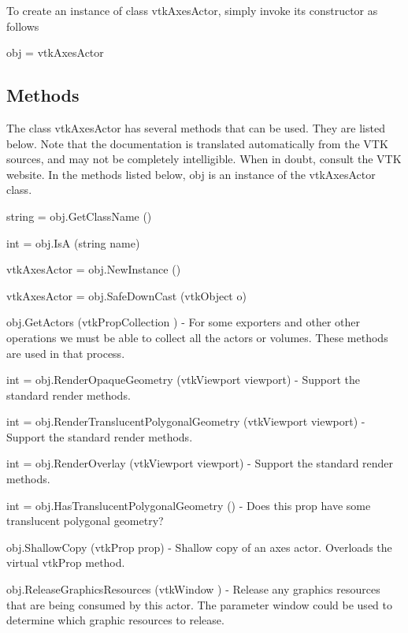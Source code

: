 To create an instance of class vtk\-Axes\-Actor, simply invoke its constructor as follows \begin{DoxyVerb}  obj = vtkAxesActor
\end{DoxyVerb}
 \hypertarget{vtkwidgets_vtkxyplotwidget_Methods}{}\subsection{Methods}\label{vtkwidgets_vtkxyplotwidget_Methods}
The class vtk\-Axes\-Actor has several methods that can be used. They are listed below. Note that the documentation is translated automatically from the V\-T\-K sources, and may not be completely intelligible. When in doubt, consult the V\-T\-K website. In the methods listed below, {\ttfamily obj} is an instance of the vtk\-Axes\-Actor class. 
\begin{DoxyItemize}
\item {\ttfamily string = obj.\-Get\-Class\-Name ()}  
\item {\ttfamily int = obj.\-Is\-A (string name)}  
\item {\ttfamily vtk\-Axes\-Actor = obj.\-New\-Instance ()}  
\item {\ttfamily vtk\-Axes\-Actor = obj.\-Safe\-Down\-Cast (vtk\-Object o)}  
\item {\ttfamily obj.\-Get\-Actors (vtk\-Prop\-Collection )} -\/ For some exporters and other other operations we must be able to collect all the actors or volumes. These methods are used in that process.  
\item {\ttfamily int = obj.\-Render\-Opaque\-Geometry (vtk\-Viewport viewport)} -\/ Support the standard render methods.  
\item {\ttfamily int = obj.\-Render\-Translucent\-Polygonal\-Geometry (vtk\-Viewport viewport)} -\/ Support the standard render methods.  
\item {\ttfamily int = obj.\-Render\-Overlay (vtk\-Viewport viewport)} -\/ Support the standard render methods.  
\item {\ttfamily int = obj.\-Has\-Translucent\-Polygonal\-Geometry ()} -\/ Does this prop have some translucent polygonal geometry?  
\item {\ttfamily obj.\-Shallow\-Copy (vtk\-Prop prop)} -\/ Shallow copy of an axes actor. Overloads the virtual vtk\-Prop method.  
\item {\ttfamily obj.\-Release\-Graphics\-Resources (vtk\-Window )} -\/ Release any graphics resources that are being consumed by this actor. The parameter window could be used to determine which graphic resources to release.  

\end{DoxyItemize}
